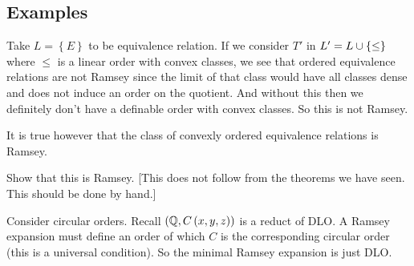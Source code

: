 \documentclass{amsart}
\begin{document}
\subsection{Examples}

\begin{exm}
Take $L = \left\{ E \right\}$ to be equivalence relation.
If we consider $T'$ in $L' = L\cup \left\{ \leq \right\}$ where $\leq$
is a linear order with convex classes, we see that ordered equivalence relations are not
Ramsey since the \Fraisse limit of that class would have all classes dense and does not
induce an order on the quotient. And without this then we definitely don't have a
definable order with convex classes. So this is not Ramsey. 

It is true however that the class of convexly ordered equivalence relations is Ramsey.
\begin{exr}
Show that this is Ramsey.
[This does not follow from the theorems we have seen. This should be done by hand.]
\end{exr}
\end{exm}
\begin{exm}
Consider circular orders. Recall $\left( \mathbb{Q} , C\left( x,y,z \right) \right)$ is a reduct of DLO. 
A Ramsey expansion must define an order of which $C$ is the corresponding
circular order (this is a universal condition). So the minimal Ramsey expansion 
is just DLO.
\end{exm}
\end{document}
